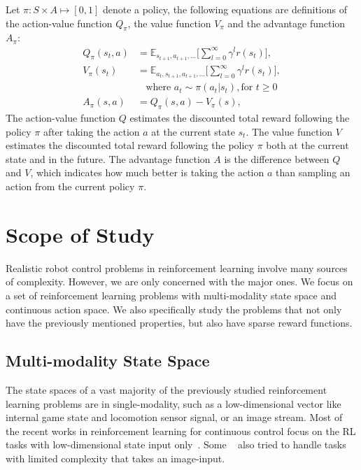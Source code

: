 Let $\pi : S \times A \mapsto [0,1] $ denote a policy, the following equations are definitions of the action-value function $Q_\pi $, the value function $V_\pi $ and the advantage function $A_\pi $:
\begin{align}
Q_\pi(s_t,a) &= \mathbb{E}_{s_{t+1},a_{t+1},\ldots}
\big[ \sum_{l=0}^\infty \gamma^l r(s_{t}) \big], \\
V_\pi(s_t) &= \mathbb{E}_{a_{t},s_{t+1},a_{t+1},\ldots}
\big[ \sum_{l=0}^\infty \gamma^l  r(s_{t}) \big],\\
& \ \ \ \ \text{where } a_t \sim \pi (a_t|s_t), \text{for } t \geq 0  \\
A_\pi (s,a) &= Q_\pi (s,a) - V_\pi (s), 
\end{align}
The action-value function $Q$ estimates the discounted total reward following the policy $\pi$ after taking the action $a$ at the current state $s_t$. The value function $V$ estimates the discounted total reward following the policy $\pi$ both at the current state and in the future. The advantage function $A$ is the difference between $Q$ and $V$, which indicates how much better is taking the action $a$ than sampling an action from the current policy $\pi$.




\section{Scope of Study}
Realistic robot control problems in reinforcement learning involve many sources of complexity. However, we are only concerned with the major ones.
We focus on a set of reinforcement learning problems with multi-modality state space and continuous action space. We also specifically study the problems that not only have the previously mentioned properties, but also have sparse reward functions.

\subsection{Multi-modality State Space}

The state spaces of a vast majority of the previously studied reinforcement learning problems are in single-modality, such as a low-dimensional vector like internal game state and locomotion sensor signal, or an image stream. Most of the recent works in reinforcement learning for continuous control focus on the RL tasks with low-dimensional state input only~\cite{duan2016benchmarking}. Some ~\cite{wu2017scalable} also tried to handle tasks with limited complexity that takes an image-input.

